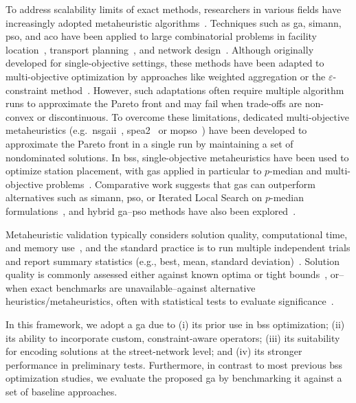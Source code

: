 To address scalability limits of exact methods, researchers in various fields have increasingly adopted metaheuristic algorithms~\cite{Tomar2023}. Techniques such as \ac{ga}, \ac{simann}, \ac{pso}, and \ac{aco} have been applied to large combinatorial problems in facility location~\cite{Chadry2003, Chalupa2019}, transport planning~\cite{Holliday2023, Sachan2024}, and network design~\cite{Gallo2010, Madadi2024}. Although originally developed for single-objective settings, these methods have been adapted to multi-objective optimization by approaches like weighted aggregation or the $\varepsilon$-constraint method~\cite{Rahimi2023}. However, such adaptations often require multiple algorithm runs to approximate the Pareto front and may fail when trade-offs are non-convex or discontinuous. To overcome these limitations, dedicated multi-objective metaheuristics (e.g.\ \ac{nsgaii}~\cite{Deb2002}, \ac{spea2}~\cite{Zitzler2001} or \ac{mopso}~\cite{Coello2002}) have been developed to approximate the Pareto front in a single run by maintaining a set of nondominated solutions. In \ac{bss}, single-objective metaheuristics have been used to optimize station placement, with \acp{ga} applied in particular to $p$-median and multi-objective problems~\cite{Cintrano2018, Qian2022, Liu2015, Caggiani2020}. Comparative work suggests that \acp{ga} can outperform alternatives such as \ac{simann}, \ac{pso}, or Iterated Local Search on $p$-median formulations~\cite{Cintrano2018}, and hybrid \ac{ga}--\ac{pso} methods have also been explored~\cite{Askari2017, Chen2020}.

Metaheuristic validation typically considers solution quality, computational time, and memory use~\cite{Osaba2021}, and the standard practice is to run multiple independent trials and report summary statistics (e.g., best, mean, standard deviation)~\cite{Osaba2021}. Solution quality is commonly assessed either against known optima or tight bounds~\cite{Roshanaei2010}, or--when exact benchmarks are unavailable--against alternative heuristics/metaheuristics, often with statistical tests to evaluate significance~\cite{Derrac2011, Danka2013}.

In this framework, we adopt a \ac{ga} due to (i) its prior use in \ac{bss} optimization; (ii) its ability to incorporate custom, constraint-aware operators; (iii) its suitability for encoding solutions at the street-network level; and (iv) its stronger performance in preliminary tests. Furthermore, in contrast to most previous \ac{bss} optimization studies, we evaluate the proposed \ac{ga} by benchmarking it against a set of baseline approaches.

